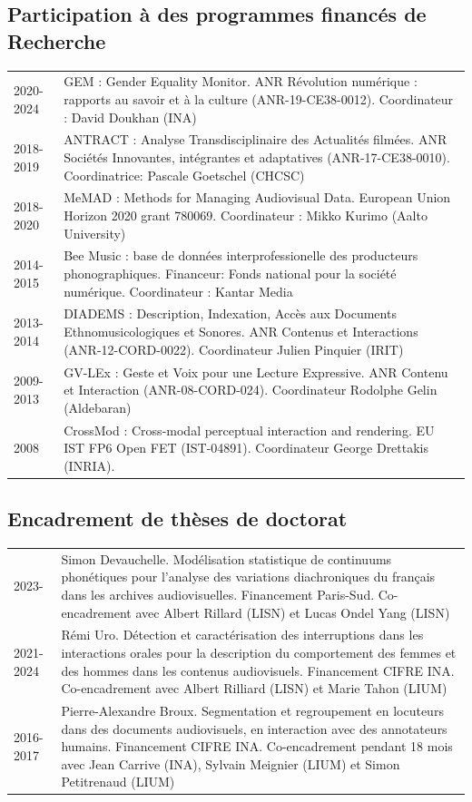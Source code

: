 \begin{fr}
\subsection{Participation à des programmes financés de Recherche}
\begin{tabularx}{\linewidth}{@{}l X@{}}
2020-2024 & GEM : Gender Equality Monitor. ANR Révolution numérique : rapports au savoir et à la culture (ANR-19-CE38-0012). Coordinateur : David Doukhan (INA)\\
2018-2019 & ANTRACT : Analyse Transdisciplinaire des Actualités filmées. ANR Sociétés Innovantes, intégrantes et adaptatives (ANR-17-CE38-0010). Coordinatrice: Pascale Goetschel (CHCSC)\\
2018-2020 & MeMAD : Methods for Managing Audiovisual Data. European Union Horizon 2020 grant 780069. Coordinateur : Mikko Kurimo (Aalto University)\\
2014-2015 & Bee Music : base de données interprofessionelle des producteurs phonographiques. Financeur: Fonds national pour la société numérique. Coordinateur : Kantar Media\\
2013-2014 & DIADEMS : Description, Indexation, Accès aux Documents Ethnomusicologiques et Sonores. ANR Contenus et Interactions (ANR-12-CORD-0022). Coordinateur Julien Pinquier (IRIT)\\
2009-2013 & GV-LEx : Geste et Voix pour une Lecture Expressive. ANR Contenu et Interaction (ANR-08-CORD-024). Coordinateur Rodolphe Gelin (Aldebaran)\\
2008 & CrossMod : Cross-modal perceptual interaction and rendering. EU IST FP6 Open FET (IST-04891). Coordinateur George Drettakis (INRIA).\\
\end{tabularx}
\end{fr}


\begin{fr}
\subsection{Encadrement de thèses de doctorat}
\begin{tabularx}{\linewidth}{@{}l X@{}}
2023- & Simon Devauchelle. Modélisation statistique de continuums phonétiques pour l'analyse des variations diachroniques du français dans les archives audiovisuelles. Financement Paris-Sud. Co-encadrement avec Albert Rillard (LISN) et Lucas Ondel Yang (LISN)\\
2021-2024 & Rémi Uro. Détection et caractérisation des interruptions dans les interactions orales pour la description du comportement des femmes et des hommes dans les contenus audiovisuels. Financement CIFRE INA. Co-encadrement avec Albert Rilliard (LISN) et Marie Tahon (LIUM)\\
2016-2017 & Pierre-Alexandre Broux. Segmentation et regroupement en locuteurs dans des documents audiovisuels, en interaction avec des annotateurs humains. Financement CIFRE INA. Co-encadrement pendant 18 mois avec Jean Carrive (INA), Sylvain Meignier (LIUM) et Simon Petitrenaud (LIUM)\\
\end{tabularx}
\end{fr}

